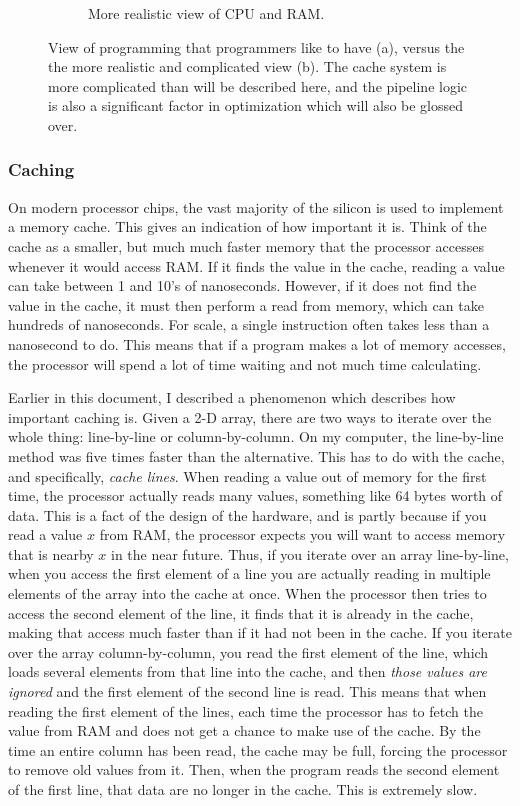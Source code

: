 \begin{figure}[h]
\begin{subfigure}{0.4\textwidth}
\caption{More realistic view of CPU and RAM.} \label{fig:1b}
\end{subfigure}
\label{fig:cpu-and-ram}
	\caption[Simplistic versus realistic view of processor and memory.]{View of programming that programmers like to have (a), versus the the more realistic
	and complicated view (b). The cache system is more complicated than will be described here, and the pipeline logic is
	also a significant factor in optimization which will also be glossed over.}
\end{figure}

\subsubsection{Caching}

On modern processor chips, the vast majority of the silicon is used to implement a memory cache. This gives an indication
of how important it is. Think of the cache as a smaller, but much much faster memory that the processor accesses whenever
it would access RAM. If it finds the value in the cache, reading a value can take between 1 and 10's of nanoseconds. However,
if it does not find the value in the cache, it must then perform a read from memory, which can take hundreds of nanoseconds.
For scale, a single instruction often takes less than a nanosecond to do. This means that if a program makes a lot of
memory accesses, the processor will spend a lot of time waiting and not much time calculating.

Earlier in this document, I described a phenomenon which describes how important caching is. Given a 2-D array, there are two
ways to iterate over the whole thing: line-by-line or column-by-column. On my computer, the line-by-line method was five times
faster than the alternative. This has to do with the cache, and specifically, \textit{cache lines}. When reading a value out
of memory for the first time, the processor actually reads many values, something like 64 bytes worth of data. This is a fact
of the design of the hardware, and is partly because if you read a value $x$ from RAM, the processor expects you will want to
access memory that is nearby $x$ in the near future. Thus, if you iterate over an array line-by-line, when you access the
first element of a line you are actually reading in multiple elements of the array into the cache at once. When the processor
then tries to access the second element of the line, it finds that it is already in the cache, making that access much faster
than if it had not been in the cache. If you iterate over the array column-by-column, you read the first element of the line,
which loads several elements from that line into the cache, and then \textit{those values are ignored} and the first element
of the second line is read. This means that when reading the first element of the lines, each time the processor has to fetch
the value from RAM and does not get a chance to make use of the cache. By the time an entire column has been read, the cache
may be full, forcing the processor to remove old values from it. Then, when the program reads the second element of the first line,
that data are no longer in the cache. This is extremely slow.

